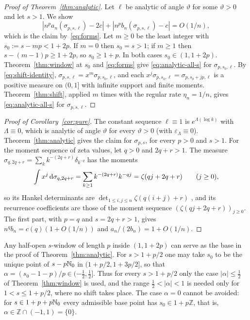 \begin{proof}[Proof of Theorem~\ref{thm:analytic}]
Let $\ell$ be analytic of angle $\vartheta$ for some $\vartheta>0$ and let $s>1$. We show
\begin{equation}\label{eq:analytic-all-s}
  |n^pa_n(\sigma_{p,s,\ell})-2c|+|n^pb_n(\sigma_{p,s,\ell})-c|=O(1/n),
\end{equation}
which is the claim by~\eqref{eq:forms}. Let $m\ge0$ be the least integer with $s_0:=s-mp<1+2p$. If $m=0$ then
$s_0=s>1$; if $m\ge1$ then $s-(m-1)p\ge1+2p$, so $s_0\ge1+p$. In both cases $s_0\in(1,1+2p)$.
Theorem~\ref{thm:window} at $s_0$ and \eqref{eq:forms} give \eqref{eq:analytic-all-s} for $\sigma_{p,s_0,\ell}$. By
\eqref{eq:shift-identity}, $\sigma_{p,s,\ell}=x^m\sigma_{p,s_0,\ell}$, and each $x^j\sigma_{p,s_0,\ell}=\sigma_{p,s_0+jp,\ell}$ is
a positive measure on $(0,1]$ with infinite support and finite moments. Theorem~\ref{thm:shift}, applied $m$ times with
the regular rate $\eta_n=1/n$, gives \eqref{eq:analytic-all-s} for $\sigma_{p,s,\ell}$.
\end{proof}

\begin{proof}[Proof of Corollary~\ref{cor:pure}]
The constant sequence $\ell\equiv1$ is $e^{\Lambda(\log k)}$ with $\Lambda\equiv0$, which is analytic of angle
$\vartheta$ for every $\vartheta>0$ (with $\varepsilon_\Lambda\equiv0$). Theorem~\ref{thm:analytic} gives the claim for
$\sigma_{p,s}$, for every $p>0$ and $s>1$. For the moment sequence of zeta values, let $q>0$ and $2q+r>1$. The measure
$\sigma_{q,2q+r}=\sum_kk^{-(2q+r)}\delta_{k^{-q}}$ has the moments
\[
  \int x^j\,\mathrm{d}\sigma_{q,2q+r}=\sum_{k\ge1}k^{-(2q+r)}k^{-qj}=\zeta(qj+2q+r)\qquad(j\ge0),
\]
so its Hankel determinants are $\det_{1\le i,j\le n}\zeta(q(i+j)+r)$ \cite[Corollary~1.4]{Paper1}, and its recurrence
coefficients are those of the moment sequence $(\zeta(qj+2q+r))_{j\ge0}$. The first part, with $p=q$ and
$s=2q+r>1$, gives $n^qb_n=c(q)(1+O(1/n))$ and $a_n/(2b_n)=1+O(1/n)$.
\end{proof}

\begin{remark}\label{rem:base-window}
Any half-open $s$-window of length $p$ inside $(1,1+2p)$ can serve as the base in the proof of
Theorem~\ref{thm:analytic}. For $s>1+p/2$ one may take $s_0$ to be the unique point of $s-p\mathbb{N}_0$ in
$(1+p/2,1+3p/2]$, so that $\alpha=(s_0-1-p)/p\in(-\frac12,\frac12]$. Thus for every $s>1+p/2$ only the case
$|\alpha|\le\frac12$ of Theorem~\ref{thm:window} is used, and the range $\frac12<|\alpha|<1$ is needed only for
$1<s\le1+p/2$, where no shift takes place. The case $\alpha=0$ cannot be avoided: for $s\in1+p+p\mathbb{N}_0$ every admissible
base point has $s_0\in1+p\mathbb Z$, that is, $\alpha\in\mathbb Z\cap(-1,1)=\{0\}$.
\end{remark}
